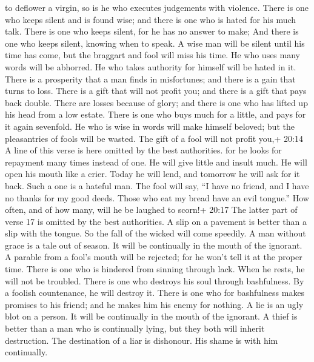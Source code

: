 to deflower a virgin, so is he who executes judgements with violence.
 There is one who keeps silent and is found wise; and there
is one who is hated for his much talk.  There is one who
keeps silent, for he has no answer to make; And there is one who keeps
silent, knowing when to speak.  A wise man will be silent
until his time has come, but the braggart and fool will miss his time.
 He who uses many words will be abhorred. He who takes
authority for himself will be hated in it.  There is a
prosperity that a man finds in misfortunes; and there is a gain that
turns to loss.  There is a gift that will not profit you;
and there is a gift that pays back double.  There are
losses because of glory; and there is one who has lifted up his head
from a low estate.  There is one who buys much for a
little, and pays for it again sevenfold.  He who is wise in
words will make himself beloved; but the pleasantries of fools will be
wasted.  The gift of a fool will not profit you,+ 20:14 A
line of this verse is here omitted by the best authorities. for he looks
for repayment many times instead of one.  He will give
little and insult much. He will open his mouth like a crier. Today he
will lend, and tomorrow he will ask for it back. Such a one is a hateful
man.  The fool will say, ``I have no friend, and I have no
thanks for my good deeds. Those who eat my bread have an evil tongue.''
 How often, and of how many, will he be laughed to scorn!+
20:17 The latter part of verse 17 is omitted by the best authorities.
 A slip on a pavement is better than a slip with the
tongue. So the fall of the wicked will come speedily.  A
man without grace is a tale out of season. It will be continually in the
mouth of the ignorant.  A parable from a fool's mouth will
be rejected; for he won't tell it at the proper time. 
There is one who is hindered from sinning through lack. When he rests,
he will not be troubled.  There is one who destroys his
soul through bashfulness. By a foolish countenance, he will destroy it.
 There is one who for bashfulness makes promises to his
friend; and he makes him his enemy for nothing.  A lie is
an ugly blot on a person. It will be continually in the mouth of the
ignorant.  A thief is better than a man who is continually
lying, but they both will inherit destruction.  The
destination of a liar is dishonour. His shame is with him continually.
